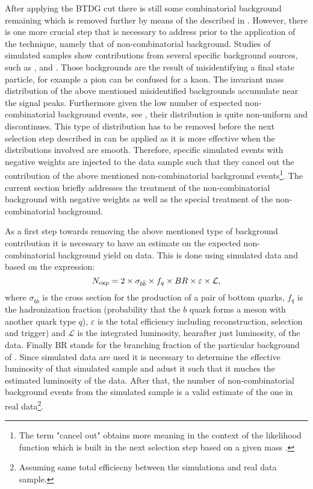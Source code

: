 After applying the BTDG cut there is still some combinatorial background remaining which is removed
further by means of the \sWeights described in . However, there is
one more crucial step that is necessary to address prior to the application of the \sPlot technique,
namely that of non-combinatorial background.
Studies of simulated samples show contributions from several specific background sources, such as \BsJpsiKK, \BsJpsipipi and \BdJpsipipi.
Those backgrounds are the result of misidentifying a final state particle, for example a pion can
be confused for a kaon. The invariant mass distribution of the above mentioned misidentified backgrounds
accumulate near the \BJpsiKpi signal peaks. Furthermore given the low number of expected non-combinatorial background events,
see , their distribution is quite non-uniform and discontinues. This type of distribution has to be removed
before the next selection step described in  can be applied as it is more effective
when the distributions involved are smooth. Therefore, specific simulated events with negative weights
are injected to the data sample such that they cancel out the contribution of the above mentioned non-combinatorial background
events\footnote{The term "cancel out" obtains more meaning in the context of the likelihood function which is built in
the next selection step  based on a given mass \pdf. }.
The current section briefly addresses the treatment of the non-combinatorial background with negative weights
as well as the special treatment of the \LbJpsippi non-combinatorial background.

As a first step towards removing the above mentioned type of background contribution it is necessary to have an estimate
on the expected non-combinatorial background yield on data. This is done using simulated data and based on the expression:
\begin{equation}
N_{\rm exp} = 2 \times \sigma_{b\bar{b}}\times f_q \times BR \times \varepsilon \times {\mathcal{L}},
\end{equation}
\noindent where $\sigma_{b\bar{b}}$ is the cross section for the production of a pair of bottom quarks, $f_q$ is the hadronization fraction
(probability that the $b$ quark forms a meson with another quark type $q$), $\varepsilon$ is the total efficiency including reconstruction,
selection and trigger) and ${\mathcal{L}}$ is the integrated luminosity, hearafter just luminosity, of the data. Finally BR stands for the
branching fraction of the particular background of . Since simulated data are used it is necessary to determine
the effective luminosity of that simulated sample and adust it such that it muches the estimated luminosity of the data. After that, the
number of non-combinatorial background events from the simulated sample is a valid estimate of the one in real
data\footnote{Assuming same total efficiecny between the simulationa and real data sample.}.

